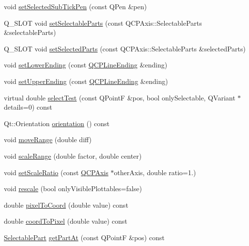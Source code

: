 \begin{DoxyCompactItemize}
\item 
void \mbox{\hyperlink{class_q_c_p_axis_a2a00a7166600155eac26843132eb9576}{set\+Selected\+Sub\+Tick\+Pen}} (const Q\+Pen \&pen)
\item 
Q\+\_\+\+S\+L\+OT void \mbox{\hyperlink{class_q_c_p_axis_a513f9b9e326c505d9bec54880031b085}{set\+Selectable\+Parts}} (const Q\+C\+P\+Axis\+::\+Selectable\+Parts \&selectable\+Parts)
\item 
Q\+\_\+\+S\+L\+OT void \mbox{\hyperlink{class_q_c_p_axis_ab9d7a69277dcbed9119b3c1f25ca19c3}{set\+Selected\+Parts}} (const Q\+C\+P\+Axis\+::\+Selectable\+Parts \&selected\+Parts)
\item 
void \mbox{\hyperlink{class_q_c_p_axis_a08af1c72db9ae4dc8cb8a973d44405ab}{set\+Lower\+Ending}} (const \mbox{\hyperlink{class_q_c_p_line_ending}{Q\+C\+P\+Line\+Ending}} \&ending)
\item 
void \mbox{\hyperlink{class_q_c_p_axis_a69119b892fc306f651763596685aa377}{set\+Upper\+Ending}} (const \mbox{\hyperlink{class_q_c_p_line_ending}{Q\+C\+P\+Line\+Ending}} \&ending)
\item 
virtual double \mbox{\hyperlink{class_q_c_p_axis_a48e4f1bafd1826ba2ad46b691205bb90}{select\+Test}} (const Q\+PointF \&pos, bool only\+Selectable, Q\+Variant $\ast$details=0) const
\item 
Qt\+::\+Orientation \mbox{\hyperlink{class_q_c_p_axis_ab988ef4538e2655bb77bd138189cd42e}{orientation}} () const
\item 
void \mbox{\hyperlink{class_q_c_p_axis_a18f3a68f2b691af1fd34b6593c886630}{move\+Range}} (double diff)
\item 
void \mbox{\hyperlink{class_q_c_p_axis_a7072ff96fe690148f1bbcdb4f773ea1c}{scale\+Range}} (double factor, double center)
\item 
void \mbox{\hyperlink{class_q_c_p_axis_af4bbd446dcaee5a83ac30ce9bcd6e125}{set\+Scale\+Ratio}} (const \mbox{\hyperlink{class_q_c_p_axis}{Q\+C\+P\+Axis}} $\ast$other\+Axis, double ratio=1.)
\item 
void \mbox{\hyperlink{class_q_c_p_axis_a499345f02ebce4b23d8ccec96e58daa9}{rescale}} (bool only\+Visible\+Plottables=false)
\item 
double \mbox{\hyperlink{class_q_c_p_axis_a536ef8f624cac59b6b6fdcb495723c57}{pixel\+To\+Coord}} (double value) const
\item 
double \mbox{\hyperlink{class_q_c_p_axis_af15d1b3a7f7e9b53d759d3ccff1fe4b4}{coord\+To\+Pixel}} (double value) const
\item 
\mbox{\hyperlink{class_q_c_p_axis_abee4c7a54c468b1385dfce2c898b115f}{Selectable\+Part}} \mbox{\hyperlink{class_q_c_p_axis_a22ab2d71d7341b9b3974c0dd10619af2}{get\+Part\+At}} (const Q\+PointF \&pos) const

\end{DoxyCompactItemize}
